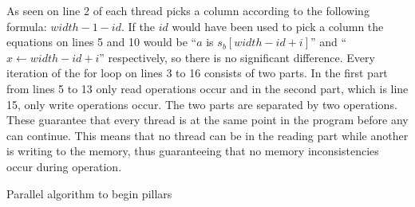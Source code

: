 As seen on line 2 of  each thread picks a column according to the following formula: $width - 1 - id$.
If the $id$ would have been used to pick a column the equations on lines 5 and 10 would be ``$a$ is $s_b[width - id + i]$'' and ``$x \gets width - id + i$'' respectively, so there is no significant difference.
Every iteration of the for loop on lines 3 to 16 consists of two parts.
In the first part from lines 5 to 13 only read operations occur and in the second part, which is line 15, only write operations occur. 
The two parts are separated by two  operations.
These guarantee that every thread is at the same point in the program before any can continue.
This means that no thread can be in the reading part while another is writing to the memory, thus guaranteeing that no memory inconsistencies occur during operation.

\begin{algorithm}[htb]
\caption{Parallel algorithm to begin pillars} \label{begin}
\begin{algorithmic}[1]
    \Statex
    \Statex
    \EndIf
    \Statex
            \Statex
            \Else
            \EndIf
            \Statex
            \Statex
        \EndIf
    \EndFor
\EndProcedure
\end{algorithmic}
\end{algorithm}

